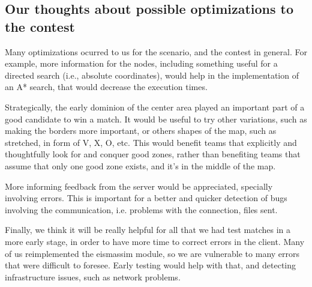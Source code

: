 \documentclass{llncs2e/llncs}
\begin{document}
\subsection{Our thoughts about possible optimizations to the contest}
    
    Many optimizations ocurred to us for the scenario, and the contest in general. 
    For example, more information for the nodes, including something useful for a 
    directed search (i.e., absolute coordinates), would help in the implementation 
    of an A* search, that would decrease the execution times.

    Strategically, the early dominion of the center area played an important part 
    of a good candidate to win a match. It would be useful to try other 
    variations, such as making the borders more important, or others shapes of the 
    map, such as stretched, in form of V, X, O, etc. This would benefit teams that 
    explicitly and thoughtfully look for and conquer good zones, rather than 
    benefiting teams that assume that only one good zone exists, and it's in the 
    middle of the map.

    More informing feedback from the server would be appreciated, specially
    involving errors. This is important for a better and quicker detection of bugs
    involving the communication, i.e. problems with the connection, files sent.

    Finally, we think it will be really helpful for all that we had test matches 
    in a more early stage, in order to have more time to correct errors in the 
    client. Many of us reimplemented the eismassim module, so we are vulnerable to 
    many errors that were difficult to foresee. Early testing would help with 
    that, and detecting infrastructure issues, such as network problems.
    

    
 
 


\end{document}
